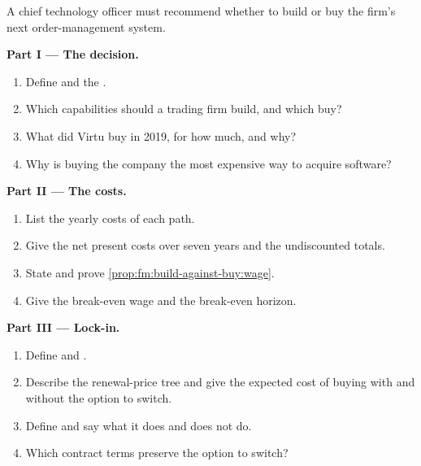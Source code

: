 \begin{problem}\label{pb:fm:build-against-buy:1}
A chief technology officer must recommend whether to build or buy the firm's next order-management system.

\medskip\noindent\textbf{Part I --- The decision.}
\begin{enumerate}
\item Define  and the .
\item Which capabilities should a trading firm build, and which buy?
\item What did Virtu buy in 2019, for how much, and why?
\item Why is buying the company the most expensive way to acquire software?
\end{enumerate}

\medskip\noindent\textbf{Part II --- The costs.}
\begin{enumerate}[resume]
\item List the yearly costs of each path.
\item Give the net present costs over seven years and the undiscounted totals.
\item State and prove \cref{prop:fm:build-against-buy:wage}.
\item Give the break-even wage and the break-even horizon.
\end{enumerate}

\medskip\noindent\textbf{Part III --- Lock-in.}
\begin{enumerate}[resume]
\item Define  and .
\item Describe the renewal-price tree and give the expected cost of buying with and without the option to switch.
\item Define  and say what it does and does not do.
\item Which contract terms preserve the option to switch?
\end{enumerate}


\end{problem}
